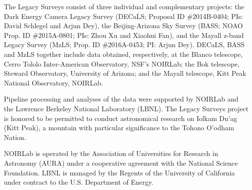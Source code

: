 \documentclass[twocolumn,linenumbers]{aastex631}
\begin{document}
The Legacy Surveys consist of three individual and complementary projects: the Dark Energy Camera Legacy Survey (DECaLS; Proposal ID \#2014B-0404; PIs: David Schlegel and Arjun Dey), the Beijing-Arizona Sky Survey (BASS; NOAO Prop. ID \#2015A-0801; PIs: Zhou Xu and Xiaohui Fan), and the Mayall z-band Legacy Survey (MzLS; Prop. ID \#2016A-0453; PI: Arjun Dey). DECaLS, BASS and MzLS together include data obtained, respectively, at the Blanco telescope, Cerro Tololo Inter-American Observatory, NSF’s NOIRLab; the Bok telescope, Steward Observatory, University of Arizona; and the Mayall telescope, Kitt Peak National Observatory, NOIRLab. 

Pipeline processing and analyses of the data were supported by NOIRLab and the Lawrence Berkeley National Laboratory (LBNL). The Legacy Surveys project is honored to be permitted to conduct astronomical research on Iolkam Du’ag (Kitt Peak), a mountain with particular significance to the Tohono O’odham Nation.

NOIRLab is operated by the Association of Universities for Research in Astronomy (AURA) under a cooperative agreement with the National Science Foundation. LBNL is managed by the Regents of the University of California under contract to the U.S. Department of Energy.
\end{document}

